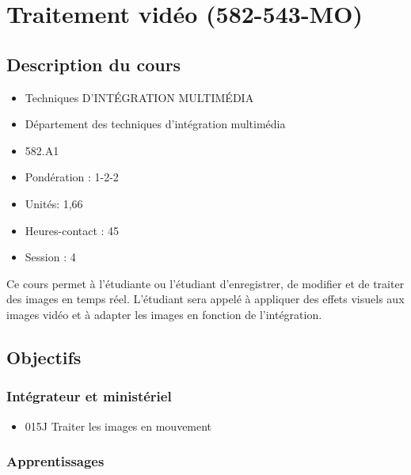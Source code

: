 \documentclass[
]{book}
\providecommand{\tightlist}{%
  \setlength{\itemsep}{0pt}\setlength{\parskip}{0pt}}
\begin{document}
\hypertarget{traitement-viduxe9o-582-543-mo}{%
\chapter{Traitement vidéo (582-543-MO)}\label{traitement-viduxe9o-582-543-mo}}

\hypertarget{description-du-cours}{%
\section{Description du cours}\label{description-du-cours}}

\begin{itemize}
\tightlist
\item
  Techniques D'INTÉGRATION MULTIMÉDIA
\item
  Département des techniques d'intégration multimédia
\item
  582.A1
\item
  Pondération : 1-2-2
\item
  Unités: 1,66
\item
  Heures-contact : 45
\item
  Session : 4
\end{itemize}

Ce cours permet à l'étudiante ou l'étudiant d'enregistrer, de modifier et de traiter des images en temps réel.
L'étudiant sera appelé à appliquer des effets visuels aux images vidéo et à adapter les images en fonction de l'intégration.

\hypertarget{objectifs}{%
\section{Objectifs}\label{objectifs}}

\hypertarget{intuxe9grateur-et-ministuxe9riel}{%
\subsection{Intégrateur et ministériel}\label{intuxe9grateur-et-ministuxe9riel}}

\begin{itemize}
\tightlist
\item
  015J Traiter les images en mouvement
\end{itemize}

\hypertarget{apprentissages}{%
\subsection{Apprentissages}\label{apprentissages}}
\end{document}
